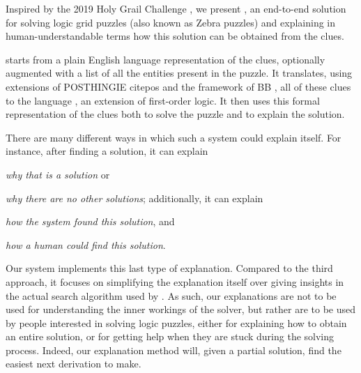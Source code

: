 Inspired by the 2019 Holy Grail Challenge \cite{}, we present \ourtool,  an end-to-end solution for solving logic grid puzzles (also known as Zebra puzzles) and explaining in human-understandable terms how this solution can be obtained from the clues. 

\ourtool starts from a plain English language representation of the clues, optionally augmented with a list of all the entities present in the puzzle. It translates, using extensions of POSTHINGIE cite{pos} and the framework of BB \cite{bos}, all of these clues to the \idp language , an extension of first-order logic. 
It then uses this formal representation of the clues both to solve the puzzle and to explain the solution. 

There are many different ways in which such a system could explain itself. For instance, after finding a solution, it can explain \begin{inparaenum}\item \emph{why that is a solution} or \item \emph{why there are no other solutions}; additionally, it can explain \item \emph{how the system found this solution}, and \item \emph{how a human could find this solution}. \end{inparaenum}
 
Our system implements this last type of explanation. Compared to the third approach, it focuses on simplifying the explanation itself over giving insights in the actual search algorithm used by \idp. As such, our explanations are not to be used for understanding the inner workings of the solver, but rather are to be used by people interested in solving logic puzzles, either for explaining how to obtain an entire solution, or for getting help when they are stuck during the solving process. Indeed, our explanation method will, given a partial solution, find the easiest next derivation to make. 
 
% 



